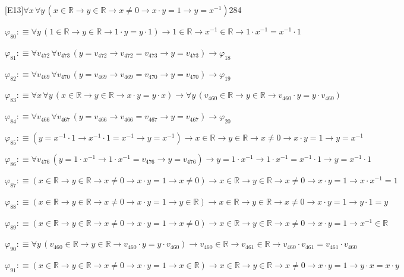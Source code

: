 \begin{fullproof}{[E13]}{$\forall x\,\forall y\,(x \in \mathbb{R} \to y \in \mathbb{R} \to x \neq 0 \to x \cdot y = 1 \to y = x^{-1})$}{284}
\begin{abbrevlist}
\item $\varphi_{80} :\equiv \forall y\,(1 \in \mathbb{R} \to y \in \mathbb{R} \to 1 \cdot y = y \cdot 1) \to 1 \in \mathbb{R} \to x^{-1} \in \mathbb{R} \to 1 \cdot x^{-1} = x^{-1} \cdot 1$
\item $\varphi_{81} :\equiv \forall v_{472}\,\forall v_{473}\,(y = v_{472} \to v_{472} = v_{473} \to y = v_{473}) \to \varphi_{18}$
\item $\varphi_{82} :\equiv \forall v_{469}\,\forall v_{470}\,(y = v_{469} \to v_{469} = v_{470} \to y = v_{470}) \to \varphi_{19}$
\item $\varphi_{83} :\equiv \forall x\,\forall y\,(x \in \mathbb{R} \to y \in \mathbb{R} \to x \cdot y = y \cdot x) \to \forall y\,(v_{460} \in \mathbb{R} \to y \in \mathbb{R} \to v_{460} \cdot y = y \cdot v_{460})$
\item $\varphi_{84} :\equiv \forall v_{466}\,\forall v_{467}\,(y = v_{466} \to v_{466} = v_{467} \to y = v_{467}) \to \varphi_{20}$
\item $\varphi_{85} :\equiv (y = x^{-1} \cdot 1 \to x^{-1} \cdot 1 = x^{-1} \to y = x^{-1}) \to x \in \mathbb{R} \to y \in \mathbb{R} \to x \neq 0 \to x \cdot y = 1 \to y = x^{-1}$
\item $\varphi_{86} :\equiv \forall v_{476}\,(y = 1 \cdot x^{-1} \to 1 \cdot x^{-1} = v_{476} \to y = v_{476}) \to y = 1 \cdot x^{-1} \to 1 \cdot x^{-1} = x^{-1} \cdot 1 \to y = x^{-1} \cdot 1$
\item $\varphi_{87} :\equiv (x \in \mathbb{R} \to y \in \mathbb{R} \to x \neq 0 \to x \cdot y = 1 \to x \neq 0) \to x \in \mathbb{R} \to y \in \mathbb{R} \to x \neq 0 \to x \cdot y = 1 \to x \cdot x^{-1} = 1$
\item $\varphi_{88} :\equiv (x \in \mathbb{R} \to y \in \mathbb{R} \to x \neq 0 \to x \cdot y = 1 \to y \in \mathbb{R}) \to x \in \mathbb{R} \to y \in \mathbb{R} \to x \neq 0 \to x \cdot y = 1 \to y \cdot 1 = y$
\item $\varphi_{89} :\equiv (x \in \mathbb{R} \to y \in \mathbb{R} \to x \neq 0 \to x \cdot y = 1 \to x \neq 0) \to x \in \mathbb{R} \to y \in \mathbb{R} \to x \neq 0 \to x \cdot y = 1 \to x^{-1} \in \mathbb{R}$
\item $\varphi_{90} :\equiv \forall y\,(v_{460} \in \mathbb{R} \to y \in \mathbb{R} \to v_{460} \cdot y = y \cdot v_{460}) \to v_{460} \in \mathbb{R} \to v_{461} \in \mathbb{R} \to v_{460} \cdot v_{461} = v_{461} \cdot v_{460}$
\item $\varphi_{91} :\equiv (x \in \mathbb{R} \to y \in \mathbb{R} \to x \neq 0 \to x \cdot y = 1 \to x \in \mathbb{R}) \to x \in \mathbb{R} \to y \in \mathbb{R} \to x \neq 0 \to x \cdot y = 1 \to y \cdot x = x \cdot y$

\end{abbrevlist}
\end{fullproof}
